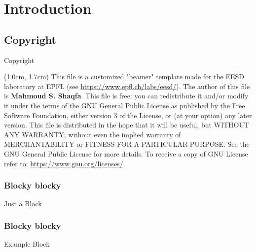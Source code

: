 \documentclass{EESD}
\begin{document}


\section{Introduction}



\subsection{Copyright}
\begin{frame}[t]{Copyright}
\begin{textblock*}{13cm}(1.0cm,  1.7cm)
    {\selectfont
    This file is a customized "beamer" template made for the EESD laboratory at EPFL (see \href{https://www.epfl.ch/labs/eesd/}{https://www.epfl.ch/labs/eesd/}). The author of this file is \textbf{Mahmoud S. Shaqfa}. This file is free: you can redistribute it and/or modify it under the terms of the GNU General Public License as published by    the Free Software Foundation, either version 3 of the License, or (at your option) any later version. This file is distributed in the hope that it will be useful, but WITHOUT ANY WARRANTY; without even the implied warranty of MERCHANTABILITY or FITNESS FOR A PARTICULAR PURPOSE.  See the GNU General Public License for more details. To receive a copy of GNU License refer to: \href{https://www.gnu.org/licenses/}{https://www.gnu.org/licenses/}
    }
\end{textblock*}
\end{frame}

\begin{frame}
\frametitle{Blocky blocky}

\begin{block}{Just a Block}
\lipsum[1]
\end{block}

\end{frame}

\begin{frame}
\frametitle{Blocky blocky}

\begin{exampleblock}{Example Block}
\lipsum[1]
\end{exampleblock}

\end{frame}
\end{document}
